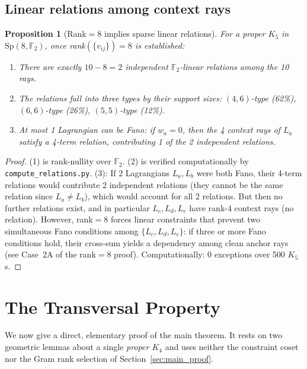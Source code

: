 \documentclass[11pt,a4paper]{article}
\newtheorem{proposition}[theorem]{Proposition}
\theoremstyle{remark}
\newcommand{\Sp}{\mathrm{Sp}}
\begin{document}
\subsection{Linear relations among context rays}

\begin{proposition}[Rank$=8$ implies sparse linear relations]\label{prop:relations}
For a proper $K_5$ in $\Sp(8,\mathbb{F}_2)$, once rank$(\{v_{ij}\}) = 8$
is established:
\begin{enumerate}
  \item There are exactly $10 - 8 = 2$ independent $\mathbb{F}_2$-linear
        relations among the 10 rays.
  \item The relations fall into three types by their support sizes:
        $(4,6)$-type (62\%), $(6,6)$-type (26\%), $(5,5)$-type (12\%).
  \item At most 1 Lagrangian can be Fano: if $w_a = 0$, then the 4 context
        rays of $L_a$ satisfy a 4-term relation, contributing 1 of the 2
        independent relations.
\end{enumerate}
\end{proposition}

\begin{proof}
(1) is rank-nullity over $\mathbb{F}_2$.
(2) is verified computationally by \texttt{compute\_relations.py}.
(3): If 2 Lagrangians $L_a, L_b$ were both Fano, their 4-term relations
would contribute 2 independent relations (they cannot be the same relation
since $L_a \neq L_b$), which would account for all 2 relations. But then
no further relations exist, and in particular $L_c, L_d, L_e$ have
rank-4 context rays (no relation). However, rank$=8$ forces linear constraints that prevent two simultaneous Fano
conditions among $\{L_c, L_d, L_e\}$: if three or more Fano conditions hold,
their cross-sum yields a dependency among clean anchor rays
(see Case~2A of the rank$=8$ proof).
Computationally: 0 exceptions over 500 $K_5$s.
\end{proof}


\section{The Transversal Property}\label{sec:transversal}

We now give a direct, elementary proof of the main theorem. It rests on two
geometric lemmas about a single \emph{proper $K_4$} and uses neither the
constraint coset nor the Gram rank selection of Section~\ref{sec:main_proof}.
\end{document}
